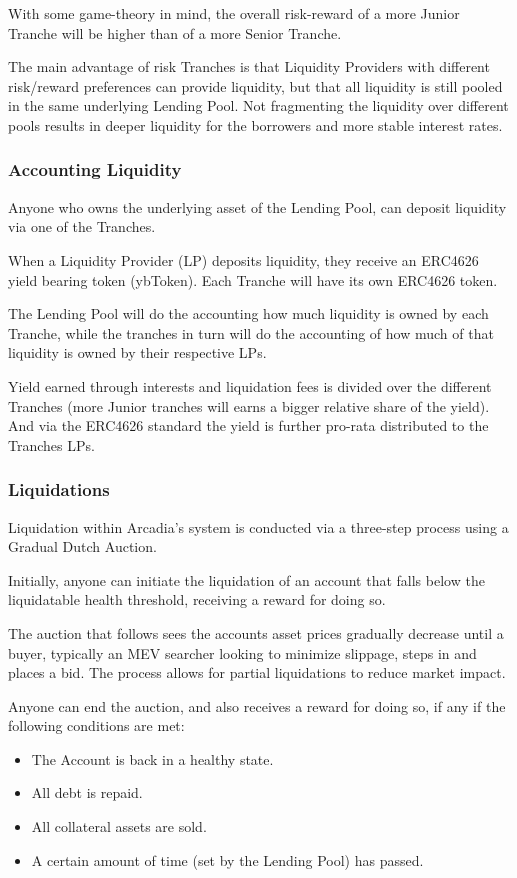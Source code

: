 \documentclass[sigconf,nonacm]{acmart}
\begin{document}
With some game-theory in mind, the overall risk-reward of a more Junior Tranche will be higher than of a more Senior Tranche.

The main advantage of risk Tranches is that Liquidity Providers with different risk/reward preferences can provide liquidity,
but that all liquidity is still pooled in the same underlying Lending Pool.
Not fragmenting the liquidity over different pools results in deeper liquidity for the borrowers and more stable interest rates.

\subsubsection{Accounting Liquidity}
\label{subsubsec:accounting-liquidity}
Anyone who owns the underlying asset of the Lending Pool, can deposit liquidity via one of the Tranches.

When a Liquidity Provider (LP) deposits liquidity, they receive an ERC4626 yield bearing token (ybToken).
Each Tranche will have its own ERC4626 token.

The Lending Pool will do the accounting how much liquidity is owned by each Tranche,
while the tranches in turn will do the accounting of how much of that liquidity is owned by their respective LPs.

Yield earned through interests and liquidation fees is divided over the different Tranches
(more Junior tranches will earns a bigger relative share of the yield).
And via the ERC4626 standard the yield is further pro-rata distributed to the Tranches LPs.

\subsubsection{Liquidations}
\label{subsubsec:liquidations}
Liquidation within Arcadia's system is conducted via a three-step process using a Gradual Dutch Auction.

Initially, anyone can initiate the liquidation of an account that falls below the liquidatable health threshold,
receiving a reward for doing so.

The auction that follows sees the accounts asset prices gradually decrease until a buyer,
typically an MEV searcher looking to minimize slippage, steps in and places a bid.
The process allows for partial liquidations to reduce market impact.

Anyone can end the auction, and also receives a reward for doing so, if any if the following conditions are met:
\begin{itemize}
    \item The Account is back in a healthy state.
    \item All debt is repaid.
    \item All collateral assets are sold.
    \item A certain amount of time (set by the Lending Pool) has passed.
\end{itemize}
\end{document}
